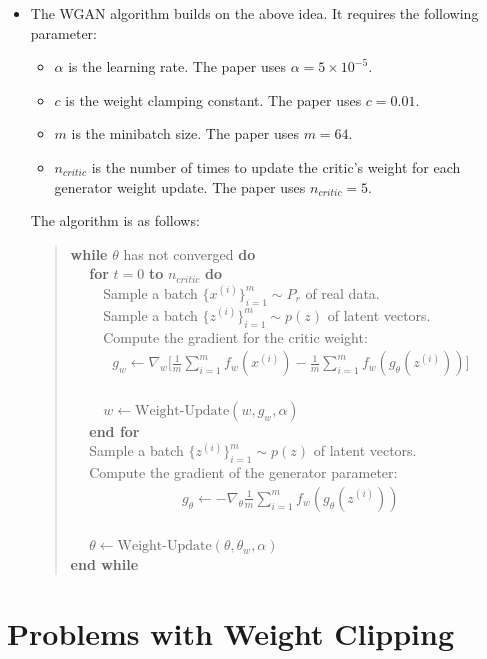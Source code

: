 \documentclass[10pt]{article}
\begin{document}
\begin{itemize}
  	\item The WGAN algorithm builds on the above idea. It requires the following parameter:
  	\begin{itemize}
  		\item $\alpha$ is the learning rate. The paper uses $\alpha = 5 \times 10^{-5}$.
  		\item $c$ is the weight clamping constant. The paper uses $c = 0.01$.
  		\item $m$ is the minibatch size. The paper uses $m = 64$.
  		\item $n_{critic}$ is the number of times to update the critic's weight for each generator weight update. The paper uses  $n_{critic} = 5$.
  	\end{itemize}
  	The algorithm is as follows:
  	\begin{verse}
  		\textbf{while} $\theta$ has not converged \textbf{do}  \\
  		$\quad$ \textbf{for} $t = 0$ \textbf{to} $n_{critic}$ \textbf{do} \\
  		$\quad\quad$ Sample a batch $\{x^(i)\}_{i=1}^m \sim P_r$ of real data. \\
  		$\quad\quad$ Sample a batch $\{z^(i)\}_{i=1}^m \sim p(z)$ of latent vectors. \\
  		$\quad\quad$ Compute the gradient for the critic weight:
  		\begin{align*}
  			g_w \gets \nabla_w \bigg[ 
  				\frac{1}{m} \sum_{i=1}^m f_w(x^{(i)})
  				- \frac{1}{m} \sum_{i=1}^m f_w(g_\theta(z^{(i)}))
  			\bigg]
  		\end{align*} \\
  		$\quad\quad$ $w \gets \mbox{Weight-Update}(w, g_w, \alpha)$ \\
  		$\quad$ \textbf{end for} \\
  		$\quad$ Sample a batch $\{z^(i)\}_{i=1}^m \sim p(z)$ of latent vectors. \\
  		$\quad$ Compute the gradient of the generator parameter:
  		\begin{align*}
  			g_\theta \gets -\nabla_{\theta} \frac{1}{m} \sum_{i=1}^m f_w(g_\theta(z^{(i)}))
  		\end{align*} \\
  		$\quad$ $\theta \gets \mbox{Weight-Update}(\theta, \theta_w, \alpha)$ \\
  		\textbf{end while}
  	\end{verse}
  \end{itemize}

  \section{Problems with Weight Clipping}
\end{document}
